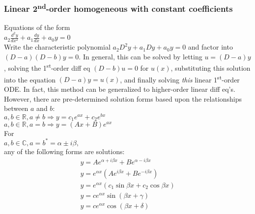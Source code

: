 \documentclass[letterpaper,landscape,10pt]{article}
\begin{document}
{\begin{multicols}{3}
		\subsubsection*{Linear 2\textsuperscript{nd}-order homogeneous with
				constant coefficients}
			Equations of the form\\
			{\centering $a_2 \frac{d^2y}{dx^2} + a_1 \frac{dy}{dx} + a_0y = 0$\\}
			Write the characteristic polynomial $a_2D^2y + a_1 Dy + a_0y = 0$
			and factor into $(D-a)(D-b)y = 0$.  In general, this can be solved
			by letting $u=(D-a)y$, solving the 1\textsuperscript{st}-order diff
			eq $(D-b)u=0$ for $u(x)$, substituting this solution into the
			equation $(D-a)y=u(x)$, and finally solving \emph{this} linear
			1\textsuperscript{st}-order ODE.  In fact, this method can be
			generalized to higher-order linear diff eq's.  However, there are
			pre-determined solution forms based upon the relationships between
			$a$ and $b$:\\
			{\centering $ a, b \in \mathbb{R}, a \neq b \Rightarrow
			y=c_1e^{ax}+c_2e^{bx} $\\}
			{\centering $ a, b \in \mathbb{R}, a = b \Rightarrow y=(Ax+B)e^{ax} $\\}
			For\\
			{\centering $ a, b \in \mathbb{C}, a = b^\ast = \alpha \pm i\beta, $\\}
			any of the following forms are solutions:\\
			\begin{gather*}
				y=Ae^{\alpha + i\beta x} + Be^{\alpha - i\beta x}\\
				y=e^{\alpha x}\left(Ae^{i\beta x} + Be^{-i\beta x}\right)\\
				y=e^{\alpha x}\left(c_1\sin\beta x + c_2\cos\beta x\right)\\
				y=ce^{\alpha x}\sin\left( \beta x + \gamma \right)\\
				y=ce^{\alpha x}\cos\left( \beta x + \delta \right)
			\end{gather*}


\end{multicols}}
\end{document}
